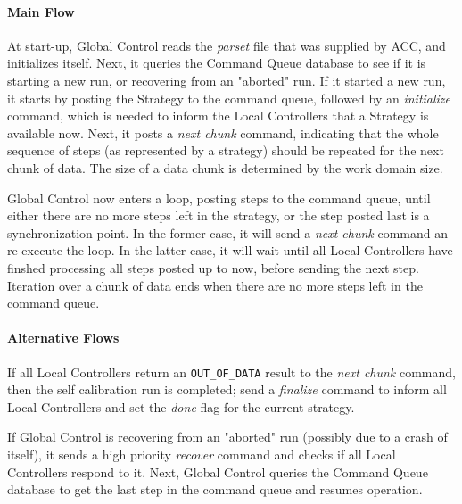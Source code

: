 \documentclass[10pt]{lofar}
\begin{document}
\paragraph*{Main Flow}
At start-up, Global Control reads the \emph{parset} file that was supplied by
ACC, and initializes itself. Next, it queries the Command Queue database to
see if it is starting a new run, or recovering from an "aborted" run. If it
started a new run, it starts by posting the Strategy to the command queue,
followed by an \textit{initialize} command, which is needed to inform the
Local Controllers that a Strategy is available now. Next, it posts a
\textit{next chunk} command, indicating that the whole sequence of steps (as
represented by a strategy) should be repeated for the next chunk of data. The
size of a data chunk is determined by the work domain size.

Global Control now enters a loop, posting steps to the command queue, until
either there are no more steps left in the strategy, or the step posted last
is a synchronization point. In the former case, it will send a \textit{next
chunk} command an re-execute the loop. In the latter case, it will wait until
all Local Controllers have finshed processing all steps posted up to now,
before sending the next step. Iteration over a chunk of data ends when there
are no more steps left in the command queue.

\paragraph*{Alternative Flows}
If all Local Controllers return an \texttt{OUT\_OF\_DATA} result to the
\textit{next chunk} command, then the self calibration run is completed; send
a \textit{finalize} command to inform all Local Controllers and set the
\textit{done} flag for the current strategy.

If Global Control is recovering from an "aborted" run (possibly due to a crash
of itself), it sends a high priority \textit{recover} command and checks if
all Local Controllers respond to it. Next, Global Control queries the Command
Queue database to get the last step in the command queue and resumes
operation.
\end{document}
